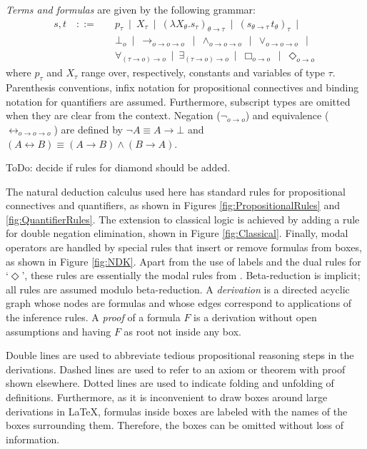 \documentclass{llncs}
\newcommand{\imp}{\rightarrow}
\newcommand{\biimp}{\leftrightarrow}
\newcommand{\all}{\forall}
\newcommand{\ex}{\exists}
\newcommand{\nec}{\Box} %
\newcommand{\pos}{\Diamond} %
\begin{document}
\begin{definition} \emph{Terms and formulas} are given by the following grammar:
\begin{align*}
 s,t \quad ::= \quad & 
  p_\tau \ \mid \ 
  X_\tau \ \mid \
  (\lambda X_\theta.s_\tau)_{\theta\imp\tau} \ \mid \ 
  (s_{\theta\imp\tau}\, t_\theta)_\tau \ \mid \\
& \bot_o \ \mid \
  \imp_{o\imp o\imp o} \ \mid \ 
  \wedge_{o\imp o\imp o} \ \mid \
  \vee_{o\imp o\imp o} \ \mid \\
& \all_{(\tau\imp o)\imp o} \ \mid \ 
  \ex_{(\tau\imp o)\imp o} \ \mid \
  \nec_{o\imp o} \ \mid \
  \pos_{o\imp o}
\end{align*}
where $p_\tau$ and $X_\tau$ range over, respectively, constants and variables of type $\tau$. Parenthesis conventions, infix notation for propositional connectives and binding notation for quantifiers are assumed. Furthermore, subscript types are omitted when they are clear from the context. Negation ($\neg_{o\imp o}$) and equivalence ($\biimp_{o\imp o\imp o}$) are defined by $\neg A\equiv A\imp \bot$ and $ (A\biimp B)\equiv (A\imp B)\wedge (B\imp A)$.
\end{definition}

ToDo: decide if rules for diamond should be added.


The natural deduction calculus used here has standard rules for propositional connectives and quantifiers, as shown in Figures \ref{fig:PropositionalRules} and \ref{fig:QuantifierRules}. The extension to classical logic is achieved by adding a rule for double negation elimination, shown in Figure \ref{fig:Classical}. Finally, modal operators are handled by special rules that insert or remove formulas from boxes, as shown in Figure \ref{fig:NDK}. Apart from the use of labels and the dual rules for `$\pos$', these rules are essentially the modal rules from \cite{todo}. Beta-reduction is implicit; all rules are assumed modulo beta-reduction. A \emph{derivation} is a directed acyclic graph whose nodes are formulas and whose edges correspond to applications of the inference rules. A \emph{proof} of a formula $F$ is a derivation without open assumptions and having $F$ as root not inside any box. 

Double lines are used to abbreviate tedious propositional reasoning steps in the derivations. Dashed lines are used to refer to an axiom or theorem with proof shown elsewhere. Dotted lines are used to indicate folding and unfolding of definitions. Furthermore, as it is inconvenient to draw boxes around large derivations in \LaTeX, formulas inside boxes are labeled with the names of the boxes surrounding them. Therefore, the boxes can be omitted without loss of information. 
\end{document}
